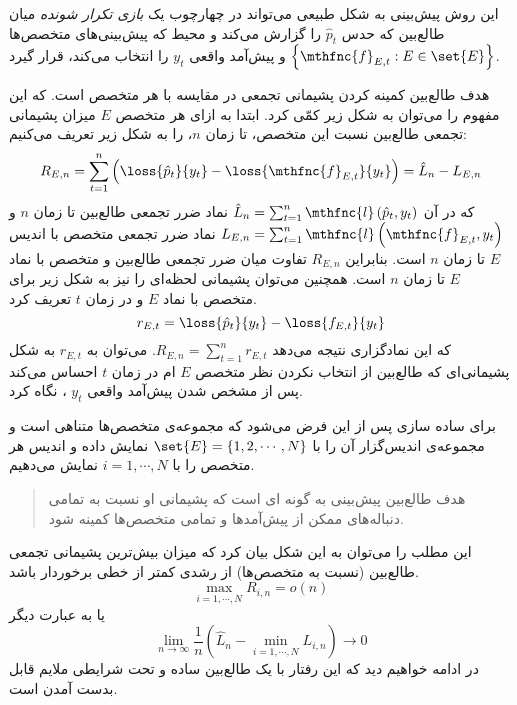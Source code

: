 
این روش پیش‌بینی به شکل طبیعی می‌تواند در چهارچوب یک 
\textit{
بازی تکرار شونده
} 
میان طالع‌بین که حدس 
$\hat{p}_t$ 
را گزارش می‌کند و محیط که پیش‌بینی‌های متخصص‌ها 
$\left\lbrace \mthfnc{f}_{E,t} : E \in \set{E} \right\rbrace$ 
و پیش‌آمد واقعی 
$y_t$ 
را انتخاب می‌کند، قرار گیرد.


هدف طالع‌بین کمینه کردن پشیمانی تجمعی
در مقایسه با هر متخصص است. که این مفهوم را می‌توان به شکل زیر کمّی کرد. ابتدا به ازای هر متخصص 
$E$ 
میزان پشیمانی تجمعی طالع‌بین نسبت این متخصص، تا زمان 
$n$، 
را به شکل زیر تعریف می‌کنیم:
\[
R_{E,n} = \sum^{n}_{t = 1} \left( \loss{\hat{p}_t}{y_t} - \loss{\mthfnc{f}_{E,t}}{y_t} \right) = \hat{L}_n - L_{E,n}
\]
که در آن 
$\hat{L}_n = \sum^{n}_{t=1} \mthfnc{l} \left( \hat{p}_t, y_t \right)$ 
نماد ضرر تجمعی طالع‌بین تا زمان 
$n$ 
و 
$L_{E,n} = \sum^{n}_{t=1} \mthfnc{l} \left( \mthfnc{f}_{E,t}, y_t \right)$ 
نماد ضرر تجمعی متخصص با اندیس 
$E$ 
تا زمان 
$n$ 
است. بنابراین 
$R_{E,n}$ 
تفاوت میان ضرر تجمعی طالع‌بین و متخصص با نماد 
$E$ 
تا زمان 
$n$ 
است. همچنین می‌توان پشیمانی لحظه‌ای را نیز به شکل زیر برای متخصص با نماد 
$E$ 
و در زمان 
$t$ 
تعریف کرد.
\[
r_{E,t} = \loss{ \hat{p}_t }{ y_t } - \loss{ f_{E,t} }{ y_t }
\]
که این نمادگزاری نتیجه می‌دهد 
$R_{E,n} = \sum^{n}_{t=1} r_{E,t}$. 
می‌توان به 
$r_{E,t}$ 
به شکل پشیمانی‌ای که طالع‌بین از انتخاب نکردن نظر متخصص 
$E$
ام در زمان 
$t$ 
احساس می‌کند پس از مشخص شدن پیش‌آمد واقعی 
$y_t$ 
، نگاه کرد.


برای ساده سازی پس از این فرض می‌شود که مجموعه‌ی متخصص‌ها متناهی است و مجموعه‌ی اندیس‌گزار آن را با 
$\set{E} = \left\lbrace 1,2, \cdots, N \right\rbrace$ 
نمایش داده و اندیس هر متخصص را با 
$i = 1, \cdots, N$ 
نمایش می‌دهیم.
\begin{quote}
هدف طالع‌بین پیش‌بینی به گونه ای است که پشیمانی او نسبت به تمامی دنباله‌های ممکن از پیش‌آمدها و تمامی متخصص‌ها کمینه شود.
\end{quote}
این مطلب را می‌توان به این شکل بیان کرد که میزان بیش‌ترین پشیمانی تجمعی طالع‌بین (نسبت به متخصص‌ها) از رشدی کمتر از خطی برخوردار باشد.
\[
\max_{i = 1, \cdots, N} R_{i,n} = o(n)
\]
یا به عبارت دیگر
\[
\lim_{n \rightarrow \infty} \frac{1}{n} \left( \hat{L}_n - \min_{i = 1, \cdots, N} L_{i,n} \right) \rightarrow 0
\]
در ادامه خواهیم دید که این رفتار با یک طالع‌بین ساده و تحت شرایطی ملایم قابل بدست آمدن است.


